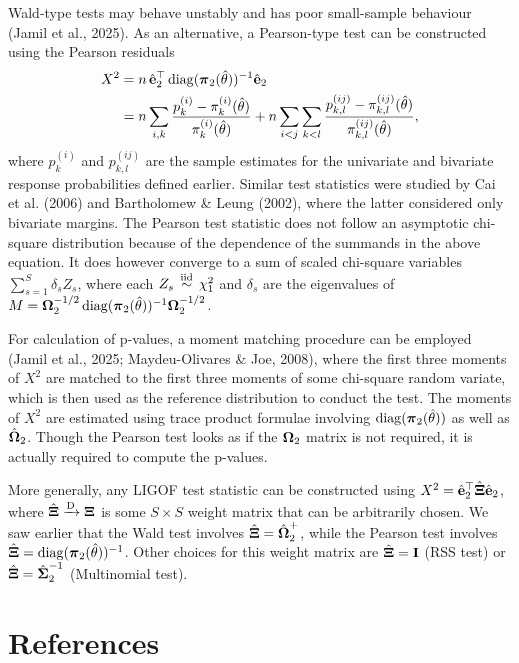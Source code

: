 \documentclass[
  letterpaper,
  DIV=11,
  numbers=noendperiod]{scrartcl}
\begin{document}
Wald-type tests may behave unstably and has poor small-sample behaviour
(Jamil et al., 2025). As an alternative, a Pearson-type test can be
constructed using the Pearson residuals \[
\begin{aligned}
X^2 
&= n \, \hat{{\mathbf e}}_2^\top \operatorname{diag}({\boldsymbol\pi}_2(\hat\theta))^{-1} \hat{{\mathbf e}}_2 \\
&= 
n \sum_{i,k} \frac{p_k^{(i)} - \pi_k^{(i)}(\hat\theta)}{\pi_k^{(i)}(\hat\theta)} +
n \sum_{i<j}\sum_{k<l} \frac{p_{k,l}^{(ij)} - \pi_{k,l}^{(ij)}(\hat\theta)}{\pi_{k,l}^{(ij)}(\hat\theta)},
\end{aligned}
\] where \(p_k^{(i)}\) and \(p_{k,l}^{(ij)}\) are the sample estimates
for the univariate and bivariate response probabilities defined earlier.
Similar test statistics were studied by Cai et al. (2006) and
Bartholomew \& Leung (2002), where the latter considered only bivariate
margins. The Pearson test statistic does not follow an asymptotic
chi-square distribution because of the dependence of the summands in the
above equation. It does however converge to a sum of scaled chi-square
variables \(\sum_{s=1}^S \delta_s Z_s\), where each
\(Z_s \,\overset{\text{iid}}{\sim}\, \chi^2_1\) and \(\delta_s\) are the eigenvalues of
\(M={\boldsymbol\Omega}_2^{-1/2} \operatorname{diag}({\boldsymbol\pi}_2(\hat\theta))^{-1} {\boldsymbol\Omega}_2^{-1/2}\).

For calculation of p-values, a moment matching procedure can be employed
(Jamil et al., 2025; Maydeu-Olivares \& Joe, 2008), where the first
three moments of \(X^2\) are matched to the first three moments of some
chi-square random variate, which is then used as the reference
distribution to conduct the test. The moments of \(X^2\) are estimated
using trace product formulae involving \(\operatorname{diag}({\boldsymbol\pi}_2(\hat\theta))\) as
well as \(\hat{{\boldsymbol\Omega}}_2\). Though the Pearson test looks as if the
\({\boldsymbol\Omega}_2\) matrix is not required, it is actually required to compute
the p-values.

More generally, any LIGOF test statistic can be constructed using
\(X^2 = \hat{{\mathbf e}}_2^\top \hat{{\boldsymbol\Xi}} \hat{{\mathbf e}}_2\), where
\(\hat{{\boldsymbol\Xi}} \xrightarrow{\text D} {\boldsymbol\Xi}\) is some \(S\times S\) weight
matrix that can be arbitrarily chosen. We saw earlier that the Wald test
involves \(\hat{{\boldsymbol\Xi}}=\hat{{\boldsymbol\Omega}}_2^{+}\), while the Pearson test involves
\(\hat{{\boldsymbol\Xi}} = \operatorname{diag}({\boldsymbol\pi}_2(\hat\theta))^{-1}\). Other choices for this
weight matrix are \(\hat{{\boldsymbol\Xi}} = {\mathbf I}\) (RSS test) or
\(\hat{{\boldsymbol\Xi}} = \hat{{\boldsymbol\Sigma}}_2^{-1}\) (Multinomial test).

\section{References}\label{references}
\end{document}

